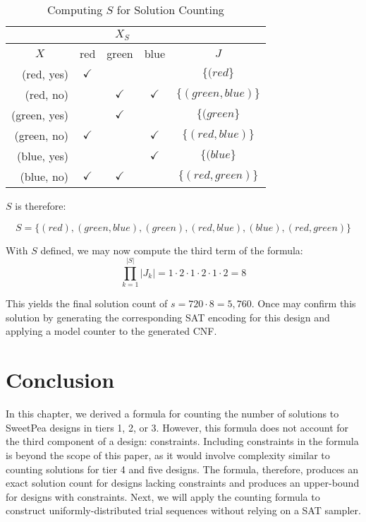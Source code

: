 \begin{table}[htb]
  \centering
  \caption{Computing $S$ for Solution Counting}
\begin{tabular}{r|c|c|c|c}
\cline{2-4}
\multicolumn{1}{c|}{}              & \multicolumn{3}{c|}{$X_S$}                 & \multicolumn{1}{l}{}                     \\ \hline
\multicolumn{1}{|c|}{$X$}          & red          & green        & blue         & \multicolumn{1}{c|}{$J$}                 \\ \hline
\multicolumn{1}{|r|}{(red, yes)}   & $\checkmark$ &              &              & \multicolumn{1}{c|}{$\{(red\}$}         \\ \hline
\multicolumn{1}{|r|}{(red, no)}    &              & $\checkmark$ & $\checkmark$ & \multicolumn{1}{c|}{$\{(green, blue)\}$} \\ \hline
\multicolumn{1}{|r|}{(green, yes)} &              & $\checkmark$ &              & \multicolumn{1}{c|}{$\{(green\}$}       \\ \hline
\multicolumn{1}{|r|}{(green, no)}  & $\checkmark$ &              & $\checkmark$ & \multicolumn{1}{c|}{$\{(red, blue)\}$}   \\ \hline
\multicolumn{1}{|r|}{(blue, yes)}  &              &              & $\checkmark$ & \multicolumn{1}{c|}{$\{(blue\}$}        \\ \hline
\multicolumn{1}{|r|}{(blue, no)}   & $\checkmark$ & $\checkmark$ &              & \multicolumn{1}{c|}{$\{(red, green)\}$}  \\ \hline
\end{tabular}
\label{tab:example_s}%
\end{table}

$S$ is therefore:

\[
S = \{(red), (green, blue), (green), (red, blue), (blue), (red, green)\}
\]

With $S$ defined, we may now compute the third term of the formula:
\[
    \prod_{k=1}^{|S|} |J_k| = 1 \cdot 2 \cdot 1 \cdot 2 \cdot 1 \cdot 2 = 8
\]

This yields the final solution count of $s = 720 \cdot 8 = 5,760$. Once may confirm this solution by generating the corresponding SAT encoding for this design and applying a model counter to the generated CNF.

\section{Conclusion}

In this chapter, we derived a formula for counting the number of solutions to SweetPea designs in tiers 1, 2, or 3. However, this formula does not account for the third component of a design: constraints. Including constraints in the formula is beyond the scope of this paper, as it would involve complexity similar to counting solutions for tier 4 and five designs. The formula, therefore, produces an exact solution count for designs lacking constraints and produces an upper-bound for designs with constraints. Next, we will apply the counting formula to construct uniformly-distributed trial sequences without relying on a SAT sampler.

